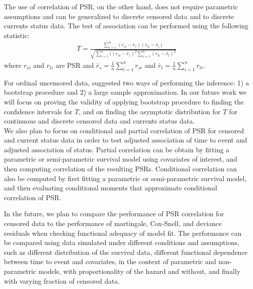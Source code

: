 \documentclass[]{article}
\begin{document}
The use of correlation of PSR, on the other hand, does not require parametric assumptions and can be generalized to discrete censored data and to discrete currents status data. The test of association can be performed using the following statistic:
$$
\begin{aligned}
	T = \frac{\sum_{i=1}^{n} (r_{si} - \bar{r}_s)(r_{ti} - \bar{r}_t)}{\sqrt{\sum_{i=1}^{n} ((r_{si} - \bar{r}_s)^2\sum_{i=1}^{n} (r_{ti} - \bar{r}_t)^2}}
\end{aligned}
$$
where $r_{si}$ and $r_{ti}$ are PSR and $\bar{r}_s = \frac{1}{n}\sum_{i=1}^{n} r_{si}$ and $\bar{r}_t = \frac{1}{n}\sum_{i=1}^{n} r_{ti}$. 

For ordinal uncensored data, \cite{li2010test} suggested two ways of performing the inference: 1) a bootstrap procedure and 2) a large sample approximation. In our future work we will focus on proving the validity of applying bootstrap procedure to finding the confidence intervals for $T$, and on finding the asymptotic distribution for $T$ for continuous and discrete censored data and currents status data.\\

We also plan to focus on conditional and partial correlation of PSR for censored and current status data in order to test adjusted association of time to event and adjusted association of status. Partial correlation can be obtain by fitting a parametric or semi-parametric survival model using covariates of interest, and then computing correlation of the resulting PSRs. Conditional correlation can also be computed by first fitting a parametric or semi-parametric survival model, and then evaluating conditional moments that approximate conditional correlation of PSR.

In the future, we plan to compare the performance of PSR correlation for censored data to the performance of martingale, Cox-Snell, and deviance residuals when checking functional adequacy of model fit. The performance can be compared using data simulated under different conditions and assumptions, such as different distribution of the survival data, different functional dependence between time to event and covariates, in the context of parametric and non-parametric models, with proportionality of the hazard and without, and finally with varying fraction of censored data.
\end{document}
